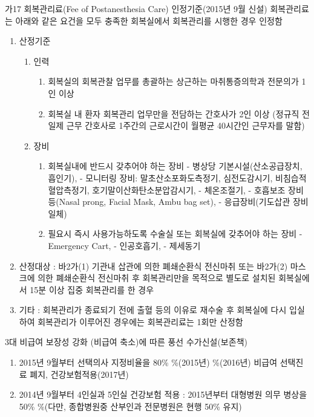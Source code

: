 \begin{description}
	\begin{Cdoing}{가17 회복관리료(Fee of Postanesthesia Care) 인정기준(2015년 9월 신설)}
회복관리료는 아래와 같은 요건을 모두 충족한 회복실에서 회복관리를 시행한 경우 인정함
	\begin{enumerate}[가.]\tightlist
	\item 산정기준
		\begin{enumerate}[(1)]\tightlist
		\item 인력
			\begin{enumerate}[(가)]\tightlist
			\item 회복실의 회복관찰 업무를 총괄하는 상근하는 마취통증의학과 전문의가 1인 이상
			\item 회복실 내 환자 회복관리 업무만을 전담하는 간호사가 2인 이상 (정규직 전일제 근무 간호사로 1주간의 근로시간이 월평균 40시간인 근무자를 말함)
			\end{enumerate}
		\item 장비
			\begin{enumerate}[(가)]\tightlist
			\item 회복실내에 반드시 갖추어야 하는 장비 - 병상당 기본시설(산소공급장치, 흡인기), - 모니터링 장비: 말초산소포화도측정기, 심전도감시기, 비침습적 혈압측정기, 호기말이산화탄소분압감시기, - 체온조절기, - 호흡보조 장비 등(Nasal prong, Facial Mask, Ambu bag set), - 응급장비(기도삽관 장비 일체) 
			\item 필요시 즉시 사용가능하도록 수술실 또는 회복실에 갖추어야 하는 장비 - Emergency Cart, - 인공호흡기, - 제세동기
			\end{enumerate}
		\end{enumerate}
	\item 산정대상 : 바2가(1) 기관내 삽관에 의한 폐쇄순환식 전신마취 또는 바2가(2) 마스크에 의한 폐쇄순환식 전신마취 후 회복관리만을 목적으로 별도로 설치된 회복실에서 15분 이상 집중 회복관리를 한 경우
	\item 기타 : 회복관리가 종료되기 전에 출혈 등의 이유로 재수술 후 회복실에 다시 입실하여 회복관리가 이루어진 경우에는 회복관리료는 1회만 산정함
	\end{enumerate}
	\end{Cdoing}
	
\end{description}
\begin{hemphsentense}{3대 비급여 보장성 강화 (비급여 축소)에 따른 풍선 수가신설(보존책)}
\begin{enumerate}[1)]\tightlist
\item 2015년 9월부터 선택의사 지정비율을 80\% \%(2015년) \%(2016년) \MVRightarrow 비급여 선택진료 폐지, 건강보험적용(2017년)
\item 2014년 9월부터 4인실과 5인실 건강보험 적용 : 2015년부터 대형병원 의무 병상을 50\% \%(다만, 종합병원중 산부인과 전문병원은 현행 50\% 유지)
\end{enumerate}
\end{hemphsentense}

